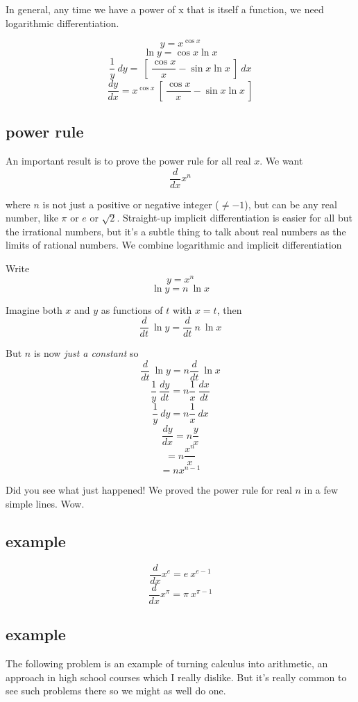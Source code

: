 \documentclass[11pt, oneside]{article}
\begin{document}
In general, any time we have a power of x that is itself a function, we need logarithmic differentiation.

\[ y = x^{\cos x} \]
\[ \ln y = \cos x \ln x \]
\[ \frac{1}{y} \ dy = \ [ \ \frac{\cos x}{x} - \sin x \ln x \ ] \ dx \]
\[ \frac{dy}{dx} = x^{\cos x} \ [ \ \frac{\cos x}{x} - \sin x \ln x \ ]  \]

\subsection*{power rule}

An important result is to prove the power rule for all real $x$.  We want
\[   \frac{d}{dx} x^n \]

where $n$ is not just a positive or negative integer ($\ne -1$), but can be any real number, like $\pi$ or $e$ or $\sqrt{2}$.  Straight-up implicit differentiation is easier for all but the irrational numbers, but it's a subtle thing to talk about real numbers as the limits of rational numbers.  We combine logarithmic and implicit differentiation

Write
\[ y = x^n \]
\[ \ln y = n \ \ln x \]

Imagine both $x$ and $y$ as functions of $t$ with $x = t$, then
\[ \frac{d}{dt} \ \ln y = \frac{d}{dt} \  n \ \ln x \]

But $n$ is now \emph{just a constant} so
\[ \frac{d}{dt} \ \ln y =  n \frac{d}{dt} \ \ln x \]
\[ \frac{1}{y} \ \frac{dy}{dt} = n  \frac{1}{x} \ \frac{dx}{dt} \]
\[ \frac{1}{y} \ dy = n  \frac{1}{x} \ dx \]
\[ \frac{dy}{dx} = n  \frac{y}{x} \]
\[  = n  \frac{x^n}{x} \]
\[ = n  x^{n-1} \]

Did you see what just happened!  We proved the power rule for real $n$ in a few simple lines.  Wow.

\subsection*{example}

\[   \frac{d}{dx} x^{e} = e \ x^{e - 1}  \]
\[   \frac{d}{dx} x^{\pi} = \pi \ x^{\pi - 1}  \]

\subsection*{example}

The following problem is an example of turning calculus into arithmetic, an approach in high school courses which I really dislike.  But it's really common to see such problems there so we might as well do one.
\end{document}
